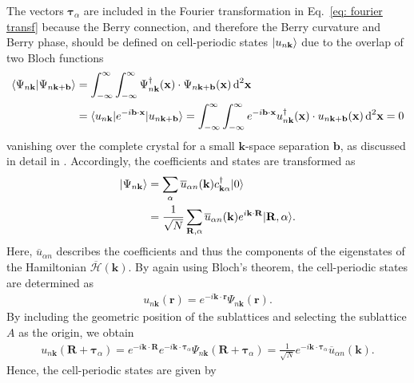 
\label{chapter: AppendixB}

The vectors $\boldsymbol{\tau}_\alpha$ are included in the Fourier transformation in Eq.~\eqref{eq: fourier transf} because the Berry connection, and therefore the Berry curvature and Berry phase, should be defined on cell-periodic states $\lvert u_{n\mathbf{k}} \rangle$ due to the overlap of two Bloch functions
\begin{align}
   \langle{{\Psi_{n\mathbf{k}}}}|{{\Psi_{n\mathbf{k}+\mathbf{b}}}}\rangle &= \int_{-\infty}^{\infty}\int_{-\infty}^{\infty} \Psi_{n\mathbf{k}}^\dagger(\mathbf{x})\cdot \Psi_{n\mathbf{k+b}}(\mathbf{x}) \,\text{d}^2\mathbf{x} \nonumber\\
   &=  \langle {u_{n\mathbf{k}}} \rvert e^{-i\mathbf{b}\cdot \mathbf{x}}\lvert {u_{n\mathbf{k+b}}} \rangle = \int_{-\infty}^{\infty}\int_{-\infty}^{\infty} e^{-i\mathbf{b}\cdot \mathbf{x}}u_{n\mathbf{k}}^\dagger(\mathbf{x})\cdot u_{n\mathbf{k+b}}(\mathbf{x}) \,\text{d}^2\mathbf{x} = 0
\end{align}
vanishing over the complete crystal for a small $\mathbf{k}$-space separation $\mathbf{b}$, as discussed in detail in \cite{Vanderbilt_2018}. Accordingly, the coefficients and states are transformed as
\begin{align}
\lvert \Psi_{n\mathbf{k}} \rangle &= \sum_\alpha \overline{u}_{\alpha n}(\mathbf{k}) c_{\mathbf{k}\alpha}^\dagger \lvert 0 \rangle \nonumber\\
&= \frac{1}{\sqrt{N}} \sum_{\mathbf{R},\alpha} 
\overline u_{\alpha n}(\mathbf{k})e^{i\mathbf{k}\cdot\mathbf{R}} \lvert \mathbf{R},\alpha \rangle.
\end{align}
Here, $\overline u_{\alpha n}$ describes the coefficients and thus the components of the eigenstates of the Hamiltonian $\overline{\mathcal{H}}(\mathbf{k})$. By again using Bloch's theorem, the cell-periodic states are determined as
\begin{align}
u_{n\mathbf{k}}(\mathbf{r}) = e^{-i\mathbf{k}\cdot\mathbf{r}}\Psi_{n\mathbf{k}}(\mathbf{r}).
\end{align}
By including the geometric position of the sublattices and selecting the sublattice $A$ as the origin, we obtain
\begin{align}
u_{n\mathbf{k}}(\mathbf{R}+\boldsymbol{\tau}_\alpha) = e^{-i \mathbf{k}\cdot \mathbf{R}}e^{-i\mathbf{k}\cdot\boldsymbol{\tau}_\alpha}\Psi_{n\mathbf{k}}(\mathbf{R}+\boldsymbol{\tau}_\alpha) = \frac{1}{\sqrt{N}}e^{-i\mathbf{k}\cdot\boldsymbol{\tau}_\alpha}\overline{u}_{\alpha n}(\mathbf{k}).
\end{align}
Hence, the cell-periodic states are given by
